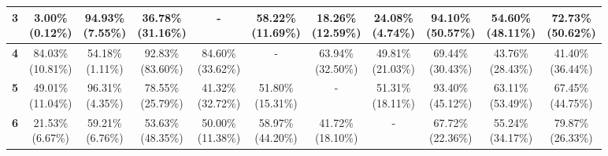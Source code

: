 \documentclass{report}
\begin{document}
\begin{center}
{\begin{tabular}{|c|c|c|c|c|c|c|c|c|c|c|}
  \textbf{3} & \makecell{3.00\% \\ (0.12\%)} & \makecell{94.93\% \\ (7.55\%)} & \makecell{36.78\% \\ (31.16\%)} & - & \makecell{58.22\% \\ (11.69\%)} & \makecell{18.26\% \\ (12.59\%)} & \makecell{24.08\% \\ (4.74\%)} & \makecell{94.10\% \\ (50.57\%)} & \makecell{54.60\% \\ (48.11\%)} & \makecell{72.73\% \\ (50.62\%)} \\ \hline

  \textbf{4} & \makecell{84.03\% \\ (10.81\%)} & \makecell{54.18\% \\ (1.11\%)} & \makecell{92.83\% \\ (83.60\%)} & \makecell{84.60\% \\ (33.62\%)} & - & \makecell{63.94\% \\ (32.50\%)} & \makecell{49.81\% \\ (21.03\%)} & \makecell{69.44\% \\ (30.43\%)} & \makecell{43.76\% \\ (28.43\%)} & \makecell{41.40\% \\ (36.44\%)} \\ \hline

  \textbf{5} & \makecell{49.01\% \\ (11.04\%)} & \makecell{96.31\% \\ (4.35\%)} & \makecell{78.55\% \\ (25.79\%)} & \makecell{41.32\% \\ (32.72\%)} & \makecell{51.80\% \\ (15.31\%)} & - & \makecell{51.31\% \\ (18.11\%)} & \makecell{93.40\% \\ (45.12\%)} & \makecell{63.11\% \\ (53.49\%)} & \makecell{67.45\% \\ (44.75\%)} \\ \hline

  \textbf{6} & \makecell{21.53\% \\ (6.67\%)} & \makecell{59.21\% \\ (6.76\%)} & \makecell{53.63\% \\ (48.35\%)} & \makecell{50.00\% \\ (11.38\%)} & \makecell{58.97\% \\ (44.20\%)} & \makecell{41.72\% \\ (18.10\%)} & - & \makecell{67.72\% \\ (22.36\%)} & \makecell{55.24\% \\ (34.17\%)} & \makecell{79.87\% \\ (26.33\%)} \\ \hline


\end{tabular}}
\end{center}
\end{document}
